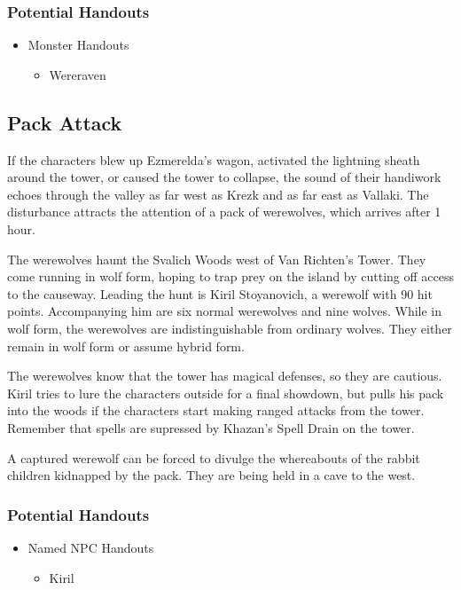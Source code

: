 \documentclass[a4paper,11pt]{article}
\begin{document}
\subsubsection{Potential Handouts}
\begin{itemize}
  \item Monster Handouts
  \begin{itemize}
    \item Wereraven
  \end{itemize}
\end{itemize}

\subsection{Pack Attack}
If the characters blew up Ezmerelda's wagon, activated the lightning sheath around the tower, or caused the tower 
to collapse, the sound of their handiwork echoes through the valley as far west as Krezk and as far east as 
Vallaki. The disturbance attracts the attention of a pack of werewolves, which arrives after 1 hour.

The werewolves haunt the Svalich Woods west of Van Richten's Tower. They come running in wolf form, hoping to trap 
prey on the island by cutting off access to the causeway. Leading the hunt is Kiril Stoyanovich, a werewolf with 90 
hit points. Accompanying him are six normal werewolves and nine wolves. While in wolf form, the werewolves are 
indistinguishable from ordinary wolves. They either remain in wolf form or assume hybrid form.

The werewolves know that the tower has magical defenses, so they are cautious. Kiril tries to lure the characters 
outside for a final showdown, but pulls his pack into the woods if the characters start making ranged attacks from 
the tower. Remember that spells are supressed by Khazan's Spell Drain on the tower.

A captured werewolf can be forced to divulge the whereabouts of the rabbit children kidnapped by the pack. They are 
being held in a cave to the west.
\subsubsection{Potential Handouts}
\begin{itemize}
  \item Named NPC Handouts
  \begin{itemize}
    \item Kiril
  \end{itemize}
\end{itemize}
\end{document}
